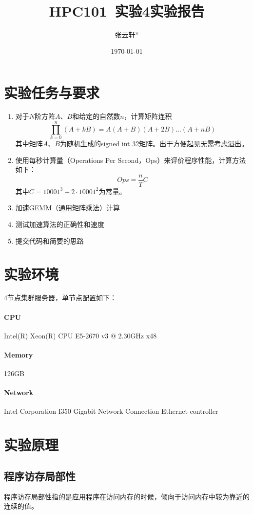 \documentclass[UTF8,10pt]{ctexart}
\title{\vspace{-2cm}HPC101\ 实验4\quad 实验报告}
\author[ ]{张云轩*\quad 3200105087}
\affil[*]{信息与电子工程学院\quad 信息工程}
\affil[*]{竺可桢学院\quad 工程教育高级班}
\date{\today}
\begin{document}
\maketitle

\section{实验任务与要求}
\begin{enumerate}[1]
    \item 对于$N$阶方阵$A$、$B$和给定的自然数$n$，计算矩阵连积
            \begin{equation}
                \prod_{k = 0}^{n} (A+kB)=A(A+B)(A+2B)...(A+nB)  
            \end{equation}
            其中矩阵$A$、$B$为随机生成的signed int 32矩阵。出于方便起见无需考虑溢出。
    \item 使用每秒计算量（Operations Per Second，Ops）来评价程序性能，计算⽅法如下：
        \begin{equation}
            Ops=\frac{n}{T}C 
        \end{equation}
        其中$C=10001^3+2·10001^2$为常量。
    \item 加速GEMM（通用矩阵乘法）计算
    \item 测试加速算法的正确性和速度
    \item 提交代码和简要的思路
\end{enumerate}

\section{实验环境}
4节点集群服务器，单节点配置如下：
\paragraph{CPU} Intel(R) Xeon(R) CPU E5-2670 v3 @ 2.30GHz x48
\paragraph{Memory} 126GB
\paragraph{Network} Intel Corporation I350 Gigabit Network Connection Ethernet controller

\section{实验原理}
\subsection{程序访存局部性}
程序访存局部性指的是应用程序在访问内存的时候，倾向于访问内存中较为靠近的连续的值。
\end{document}
